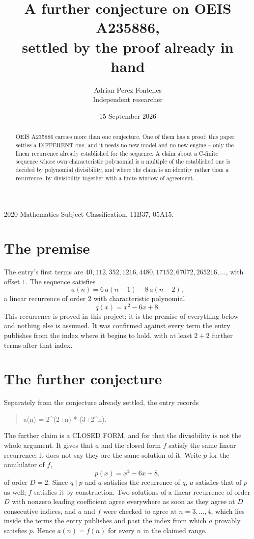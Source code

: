 \documentclass[11pt,a4paper]{article}
\title{A further conjecture on OEIS A235886,\\ \large settled by the proof already in hand}
\author{Adrian Perez Fontelles\\ \small Independent researcher}
\date{15 September 2026}
\theoremstyle{plain}
\theoremstyle{definition}
\begin{document}
\maketitle

\begin{abstract}
OEIS A235886 carries more than one conjecture. One of them has a proof; this paper settles a
DIFFERENT one, and it needs no new model and no new engine -- only the linear recurrence already
established for the sequence. A claim about a C-finite sequence whose own characteristic
polynomial is a multiple of the established one is decided by polynomial divisibility, and where
the claim is an identity rather than a recurrence, by divisibility together with a finite window
of agreement.
\end{abstract}

\noindent\small 2020 Mathematics Subject Classification. 11B37, 05A15.\normalsize

\section{The premise}

The entry's first terms are $40, 112, 352, 1216, 4480, 17152, 67072, 265216,\dots$, with offset $1$. The sequence satisfies
\[
  a(n)=6\,a(n-1) - 8\,a(n-2) ,
\]
a linear recurrence of order $2$ with characteristic polynomial
\[
  q(x)=x^{2} - 6 x + 8 .
\]
This recurrence is proved in this project; it is the premise of everything below and nothing else is assumed.
It was confirmed against every term the entry publishes from the index where it begins to hold,
with at least $2+2$ further terms after that index.

\section{The further conjecture}

Separately from the conjecture already settled, the entry records

\begin{quote}\raggedright a(n) = 2\^{}(2+n) * (3+2\^{}n).\end{quote}

The further claim is a CLOSED FORM, and for that the divisibility is not the whole argument. It
gives that $a$ and the closed form $f$ satisfy the same linear recurrence; it does not say they
are the same solution of it. Write $p$ for the annihilator of $f$,
\[
  p(x)=x^{2} - 6 x + 8 ,
\]
of order $D=2$. Since $q\mid p$ and $a$ satisfies the recurrence of $q$, $a$ satisfies that of
$p$ as well; $f$ satisfies it by construction. Two solutions of a linear recurrence of order $D$
with nonzero leading coefficient agree everywhere as soon as they agree at $D$ consecutive
indices, and $a$ and $f$ were checked to agree at $n=3,\dots,4$,
which lies inside the terms the entry publishes and past the index from which $a$ provably
satisfies $p$. Hence $a(n)=f(n)$ for every $n$ in the claimed range.
\end{document}
